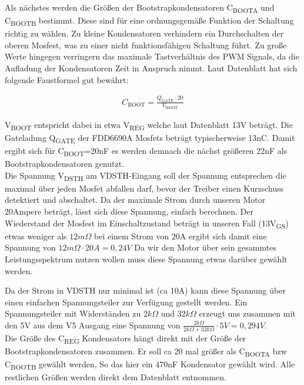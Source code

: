 Als nächstes werden die Größen der Bootstrapkondensatoren C\textsubscript{BOOTA} und C\textsubscript{BOOTB} bestimmt. Diese sind für eine ordnungsgemäße
Funktion der Schaltung richtig zu wählen. Zu kleine Kondensatoren verhindern ein Durchschalten der oberen Mosfest, was zu einer nicht funktionsfähigen Schaltung
führt. Zu große Werte hingegen verringern das maximale Tastverhältnis des PWM Signals, da die Aufladung der Kondensatoren Zeit in Anspruch nimmt.
Laut Datenblatt hat sich folgende Faustformel gut bewährt:

\begin{align*}
C_{\text{BOOT}}=\frac{Q_{\text{GATE}}\cdot20}{V_{\text{BOOT}}}
\end{align*}


V\textsubscript{BOOT} entspricht dabei in etwa V\textsubscript{REG} welche laut Datenblatt 13V beträgt.
Die Gateladung Q\textsubscript{GATE} der FDD6690A Mosfets beträgt typischerweise 13nC. Damit ergibt sich für C\textsubscript{BOOT}=20nF es werden demnach
die nächst größeren 22nF als Bootstrapkondensatoren genutzt.\\

Die Spannung V\textsubscript{DSTH} am VDSTH-Eingang soll der Spannung entsprechen die maximal über jeden Mosfet abfallen darf, bevor der Treiber einen Kurzschuss detektiert 
und abschaltet. Da der maximale Strom durch unseren Motor 20Ampere beträgt, lässt sich diese Spannung, einfach berechnen. Der Wiederstand der Mosfest im Einschaltzustand beträgt
in unseren Fall (13V\textsubscript{GS}) etwas weniger als $12m\Omega$  bei einem Strom von 20A ergibt sich damit eine Spannung von $12m\Omega \cdot 20A = 0,24V$
Da wir den Motor über sein gesammtes Leistungsspektrum nutzen wollen muss diese Spannung etwas darüber gewählt werden.

Da der Strom in VDSTH nur minimal ist (ca 10\textmu A) kann diese Spannung über einen einfachen Spannungsteiler zur Verfügung gestellt werden. Ein Spannungsteiler mit 
Widerständen zu $2k\Omega$ und $32k\Omega$ erzeugt uns zusammen mit den 5V aus dem V5 Ausgang eine Spannung von $\frac{2k\Omega}{2k\Omega+32k\Omega}\cdot 5V =0,294 V$.\\


Die Größe des C\textsubscript{REG} Kondensators hängt direkt mit der Größe der Bootstrapkondensatoren zusammen. Er soll ca 20 mal größer als
C\textsubscript{BOOTA} bzw C\textsubscript{BOOTB} gewählt werden, So das hier ein 470nF Kondensator gewählt wird.
Alle restlichen Größen werden direkt dem Datenblatt entnommen.

